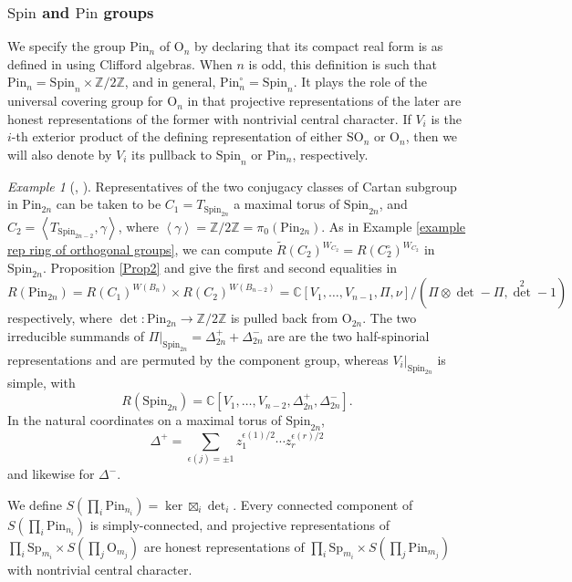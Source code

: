 \documentclass[10pt]{article}
\newcommand{\bangles}[1]{\left\langle #1 \right\rangle}
\newcommand{\Z}{\mathbb{Z}}
\newcommand{\C}{\mathbb{C}}
\newcommand{\SO}{\mathrm{SO}}
\newcommand{\Sp}{\mathrm{Sp}}
\newcommand{\OO}{\mathrm{O}}
\newcommand{\Spin}{\mathrm{Spin}}
\theoremstyle{definition}
\theoremstyle{remark}
\newtheorem{ex}{Example}
\newcommand{\Pin}{\mathrm{Pin}}
\begin{document}
\subsubsection{$\Spin$ and $\Pin$ groups}
\label{subsubsection Spin and Pin groups}
We specify the group $\Pin_n$ of $\OO_n$ by declaring that its compact real form
is as defined in \cite[Section 3]{Tak} using Clifford algebras. When $n$ is odd, this definition is 
such that $\Pin_n=\Spin_n\times\Z/2\Z$, and in general, 
$\Pin_n^\circ=\Spin_n$. It plays the role of the universal covering
group for $\OO_n$ in that projective representations of the later
are honest representations of the former with nontrivial central character.
If $V_i$ is the $i$-th exterior 
product of the defining representation of either $\SO_n$ or $\OO_n$, then we will also denote by $V_i$ 
its pullback to $\Spin_n$ or $\Pin_n$, respectively.
%
\begin{ex}[\cite{Tak}, \cite{Husemoller}]
\label{example rep ring of Pin}
Representatives of the two conjugacy classes of Cartan subgroup in $\Pin_{2n}$ can be taken to be
$C_1=T_{\Spin_{2n}}$ a maximal torus of $\Spin_{2n}$, and $C_2=\bangles{T_{\Spin_{2n-2}},\gamma}$, where
$\bangles{\gamma}=\Z/2\Z=\pi_0(\Pin_{2n})$. As in Example \ref{example rep ring of orthogonal groups},
we can compute $\tilde{R}(C_2)^{W_{C_2}}=R(C_2^\circ)^{W_{C_2}}$ in $\Spin_{2n}$. Proposition \ref{Prop2}
and \cite{Tak} give the first and second equalities in
%
\[
R(\Pin_{2n})=R(C_1)^{W(B_n)}\times R(C_2)^{W(B_{n-2})}
=\C[V_1,\dots, V_{n-1},\Pi, \nu]/(\Pi\otimes\det-\Pi, {\det}^2-1)
\]
%
respectively, where $\det\colon\Pin_{2n}\to\Z/2\Z$ is pulled back from $\OO_{2n}$.
The two irreducible summands of $\Pi|_{\Spin_{2n}}=\Delta_{2n}^++\Delta_{2n}^-$ are 
are the two half-spinorial representations and are permuted by the component 
group, whereas $V_i|_{\Spin_{2n}}$ is simple, with
%
\[
R(\Spin_{2n})=\C[V_1,\dots, V_{n-2}, \Delta_{2n}^+,\Delta_{2n}^-].
\]
%
In the natural coordinates on a maximal torus of $\Spin_{2n}$,
%
\[
\Delta^+=\sum_{\epsilon(j)=\pm 1}z_1^{\epsilon(1)/2}\cdots z_r^{\epsilon(r)/2}
\]
%
and likewise for $\Delta^-$.
\end{ex}
%
We define $S(\prod_{i}\Pin_{n_i})=\ker\boxtimes_i\det_i$. Every
connected component of $S(\prod_{i}\Pin_{n_i})$ is simply-connected, 
and projective representations of  $\prod_{i}\Sp_{m_i}\times S\left(\prod_{j}\OO_{m_j}\right)$ 
are honest representations of 
$\prod_{i}\Sp_{m_i}\times S\left(\prod_{j}\Pin_{m_j}\right)$
with nontrivial central character.
%
\end{document}
